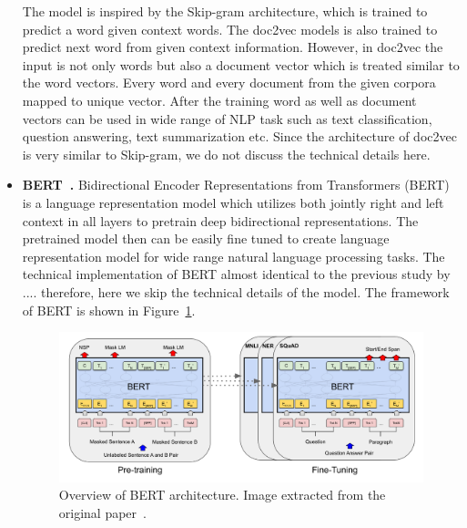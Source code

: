 \begin{itemize}
The model is inspired by the Skip-gram architecture, which is trained to predict a word given context words. The doc2vec models is also trained to predict next word from given context information. However, in doc2vec the input is not only words but also a document vector which is treated similar to the word vectors. Every word and every document from the given corpora mapped to unique vector. After the training word as well as document vectors can be used in wide range of NLP task such as text classification, question answering, text summarization etc. Since the architecture of doc2vec is very similar to Skip-gram, we do not discuss the technical details here. \\   

\item \textbf{BERT~\cite{DBLP:conf/naacl/DevlinCLT19}.} Bidirectional Encoder Representations from Transformers (BERT) is a language representation model which utilizes both jointly right and left context in all layers to pretrain deep bidirectional representations. The pretrained model then can be easily fine tuned to create language representation model for wide range natural language processing tasks. The technical implementation of BERT almost identical to the previous study by .... therefore, here we skip the technical details of the model.
The framework of BERT is shown in Figure~\ref{fig:bert}.
\begin{figure}[h]
\centering
 \includegraphics[width=\linewidth]{Figures/fig_BERT.png}
 \caption{Overview of BERT architecture. Image extracted from the original paper~\cite{DBLP:conf/naacl/DevlinCLT19}.}
 \label{fig:bert}
\end{figure} 


\end{itemize}
